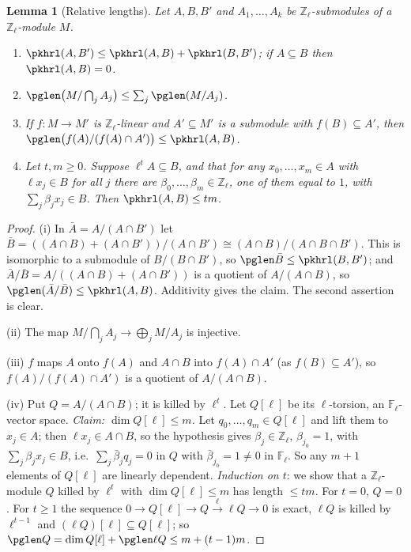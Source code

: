 \documentclass[10pt]{amsart}
\newtheorem{lemma}[theorem]{Lemma}
\theoremstyle{definition}
\theoremstyle{remark}
\newcommand{\Z}{\mathbb Z}
\begin{document}
\begin{lemma}[Relative lengths]\label{pkh:len}
Let $A,B,B'$ and $A_1,\dots,A_k$ be $\Z_\ell$-submodules of a $\Z_\ell$-module $M$.
\begin{enumerate}
\item[(i)] $\pkhrl(A,B')\le\pkhrl(A,B)+\pkhrl(B,B')$; if $A\subseteq B$ then $\pkhrl(A,B)=0$.
\item[(ii)] $\pglen\bigl(M/\bigcap_jA_j\bigr)\le\sum_j\pglen(M/A_j)$.
\item[(iii)] If $f\colon M\to M'$ is $\Z_\ell$-linear and $A'\subseteq M'$ is a submodule with $f(B)\subseteq
A'$, then $\pglen\bigl(f(A)/(f(A)\cap A')\bigr)\le\pkhrl(A,B)$.
\item[(iv)] Let $t,m\ge0$. Suppose $\ell^tA\subseteq B$, and that for any $x_0,\dots,x_m\in A$ with $\ell
x_j\in B$ for all $j$ there are $\beta_0,\dots,\beta_m\in\Z_\ell$, one of them equal to $1$, with
$\sum_j\beta_jx_j\in B$. Then $\pkhrl(A,B)\le tm$.
\end{enumerate}
\end{lemma}

\begin{proof}
(i) In $\bar A=A/(A\cap B')$ let $\bar B=((A\cap B)+(A\cap B'))/(A\cap B')\cong(A\cap B)/(A\cap B\cap B')$. This
is isomorphic to a submodule of $B/(B\cap B')$, so $\pglen\bar B\le\pkhrl(B,B')$; and $\bar A/\bar B=
A/((A\cap B)+(A\cap B'))$ is a quotient of $A/(A\cap B)$, so $\pglen(\bar A/\bar B)\le\pkhrl(A,B)$. Additivity
gives the claim. The second assertion is clear.

(ii) The map $M/\bigcap_jA_j\to\bigoplus_jM/A_j$ is injective.

(iii) $f$ maps $A$ onto $f(A)$ and $A\cap B$ into $f(A)\cap A'$ (as $f(B)\subseteq A'$), so $f(A)/(f(A)\cap
A')$ is a quotient of $A/(A\cap B)$.

(iv) Put $Q=A/(A\cap B)$; it is killed by $\ell^t$. Let $Q[\ell]$ be its $\ell$-torsion, an $\mathbb
F_\ell$-vector space. \emph{Claim: $\dim Q[\ell]\le m$.} Let $q_0,\dots,q_m\in Q[\ell]$ and lift them to
$x_j\in A$; then $\ell x_j\in A\cap B$, so the hypothesis gives $\beta_j\in\Z_\ell$, $\beta_{j_0}=1$, with
$\sum_j\beta_jx_j\in B$, i.e.\ $\sum_j\bar\beta_jq_j=0$ in $Q$ with $\bar\beta_{j_0}=1\ne0$ in $\mathbb F_\ell$.
So any $m+1$ elements of $Q[\ell]$ are linearly dependent. \emph{Induction on $t$}: we show that a
$\Z_\ell$-module $Q$ killed by $\ell^t$ with $\dim Q[\ell]\le m$ has length $\le tm$. For $t=0$, $Q=0$. For
$t\ge1$ the sequence $0\to Q[\ell]\to Q\xrightarrow{\ \ell\ }\ell Q\to0$ is exact, $\ell Q$ is killed by
$\ell^{t-1}$ and $(\ell Q)[\ell]\subseteq Q[\ell]$; so $\pglen Q=\dim Q[\ell]+\pglen\ell Q\le m+(t-1)m$.
\end{proof}
\end{document}
